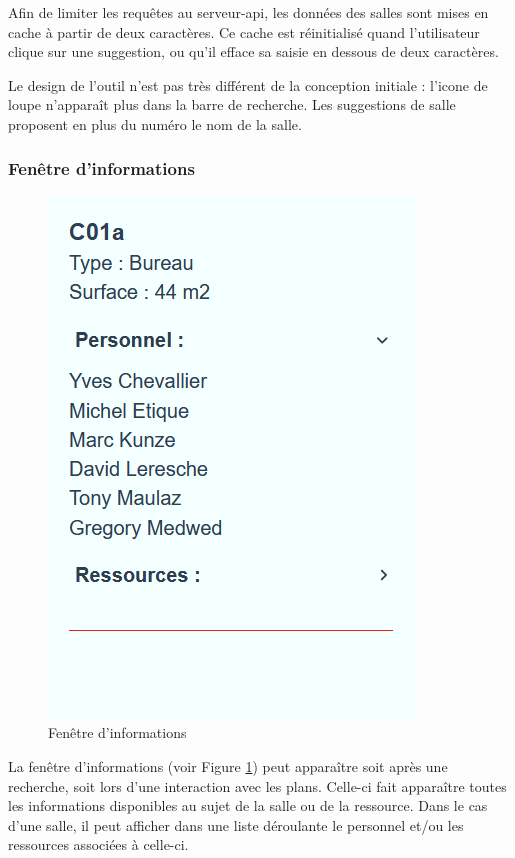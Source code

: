 \documentclass[
    iai, %
    il, %
]{heig-tb}
\begin{document}
Afin de limiter les requêtes au serveur-api, les données des salles sont mises en cache à partir de deux caractères.
Ce cache est réinitialisé quand l'utilisateur clique sur une suggestion, ou qu'il efface sa saisie en dessous de deux caractères.

Le design de l'outil n'est pas très différent de la conception initiale : l'icone de loupe n'apparaît plus dans la barre de recherche.
Les suggestions de salle proposent en plus du numéro le nom de la salle.

\subsubsection{Fenêtre d'informations}

\begin{figure}[h]
    \centering
    \includegraphics[scale=0.5]{frontend-info.png}
    \caption{Fenêtre d'informations}
    \label{fig:info}
\end{figure}

La fenêtre d'informations (voir Figure \ref{fig:info}) peut apparaître soit après une recherche, soit lors d'une interaction avec les plans.
Celle-ci fait apparaître toutes les informations disponibles au sujet de la salle ou de la ressource.
Dans le cas d'une salle, il peut afficher dans une liste déroulante le personnel
et/ou les ressources associées à celle-ci.
\end{document}
